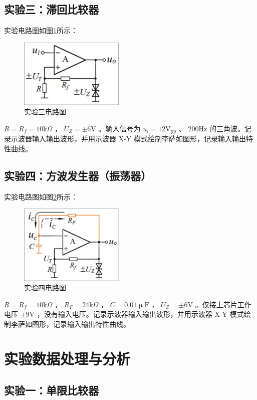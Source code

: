 \documentclass[a4paper,11pt,UTF8]{ctexart}
\newcommand\mr[1]{\mathrm{#1}}
\begin{document}
\subsection{实验三：滞回比较器}
	实验电路图如图\ref{fig:Exp03}所示：
	\begin{figure}[H]
	 \centering
	 \includegraphics[width=5cm]{Exp03}
	 \caption{实验三电路图}
	 \label{fig:Exp03}
	\end{figure}
	$R=R_f=10\mr{k}\Omega$ ， $U_Z=\pm 6\mr{V}$ 。输入信号为 $u_i=12\mr{V_{pp}}$ 、 $200\mr{Hz}$ 的三角波。记录示波器输入输出波形，并用示波器 X-Y 模式绘制李萨如图形，记录输入输出特性曲线。
\subsection{实验四：方波发生器（振荡器）}
	实验电路图如图\ref{fig:Exp04}所示：
	\begin{figure}[H]
	 \centering
	 \includegraphics[width=5cm]{Exp04}
	 \caption{实验四电路图}
	 \label{fig:Exp04}
	\end{figure}
	$R=R_f=10\mr{k}\Omega$ ， $R_F=24\mr{k}\Omega$ ， $C=0.01\mr{\upmu F}$ ， $U_Z=\pm 6\mr{V}$ 。仅接上芯片工作电压 $\pm9\mr{V}$ ，没有输入电压。记录示波器输入输出波形，并用示波器 X-Y 模式绘制李萨如图形，记录输入输出特性曲线。
	
\section{实验数据处理与分析}
\subsection{实验一：单限比较器}
\end{document}
